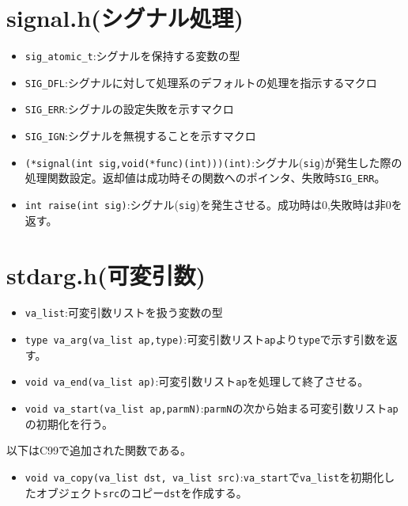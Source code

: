 \section{signal.h(シグナル処理)}
\begin{itemize}
\item \verb|sig_atomic_t|:シグナルを保持する変数の型
\item \verb|SIG_DFL|:シグナルに対して処理系のデフォルトの処理を指示するマクロ
\item \verb|SIG_ERR|:シグナルの設定失敗を示すマクロ
\item \verb|SIG_IGN|:シグナルを無視することを示すマクロ
\item \verb|(*signal(int sig,void(*func)(int)))(int)|:シグナル(\verb|sig|)が発生した際の処理関数設定。返却値は成功時その関数へのポインタ、失敗時\verb|SIG_ERR|。
\item \verb|int raise(int sig)|:シグナル(\verb|sig|)を発生させる。成功時は0,失敗時は非0を返す。
\end{itemize}

\section{stdarg.h(可変引数)}
\begin{itemize}
\item \verb|va_list|:可変引数リストを扱う変数の型
\item \verb|type va_arg(va_list ap,type)|:可変引数リスト\verb|ap|より\verb|type|で示す引数を返す。
\item \verb|void va_end(va_list ap)|:可変引数リスト\verb|ap|を処理して終了させる。
\item \verb|void va_start(va_list ap,parmN)|:\verb|parmN|の次から始まる可変引数リスト\verb|ap|の初期化を行う。
\end{itemize}
以下はC99で追加された関数である。
\begin{itemize}
\item \verb|void va_copy(va_list dst, va_list src)|:\verb|va_start|で\verb|va_list|を初期化したオブジェクト\verb|src|のコピー\verb|dst|を作成する。
\end{itemize}

